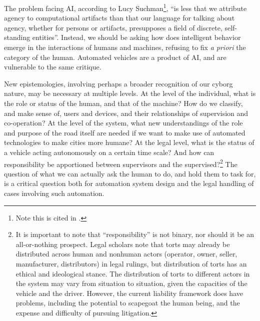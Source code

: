 
The problem facing AI, according to Lucy Suchman\footnote{Note this is cited in
  \cite[p. 331-332]{ekbia}.}, ``is less that we attribute agency to
computational artifacts than that our language for talking about
agency, whether for persons or artifacts, presupposes a field of
discrete, self-standing entities''\cite[p.
  263]{???-suchman-humanmachinereconfigurations-plansandsituatedactions-2e}.
Instead, we should be asking how does intelligent behavior emerge in
the interactions of 
humans and machines, refusing to fix \emph{a priori} the category of
the human. Automated vehicles are a product of AI, and are vulnerable
to the same critique. 

New epistemologies, involving perhaps a broader recognition of our
cyborg nature,  may be
necessary at multiple levels. At the level of the individual, what is
the role or status of the human, and that of the machine? How do we
classify, and make sense of, users and devices, and their
relationships of supervision and co-operation? At the level of the
system, what new understandings of the role and purpose of the road
itself are needed if we want to make use of automated technologies to
make cities more humane? At the legal level, what is the status of a
vehicle acting autonomously on a certain time scale? And how can
responsibility be apportioned between supervisors and the
supervised?\footnote{It is important to note that ``responsibility''
  is not binary, nor 
should it be an all-or-nothing prospect. Legal scholars note that
torts may already be distributed across human and nonhuman actors
(operator, owner, seller, manufacturer, distributors) in legal
rulings, but distribution of torts has an ethical
and ideological stance\cite{???-suemycar,etc}. The distribution of
torts to different actors in the system may vary from situation to
situation, given the capacities of 
the vehicle and the driver\cite{???-disableddriverexample}. However,
the current liability framework does have problems, including the
potential to scapegoat the human being, and the expense and difficulty
of pursuing litigation.}
The question of what we can actually ask the human to do, and hold them to task
for, is a critical question both for automation system design and the
legal handling of cases involving such automation.


